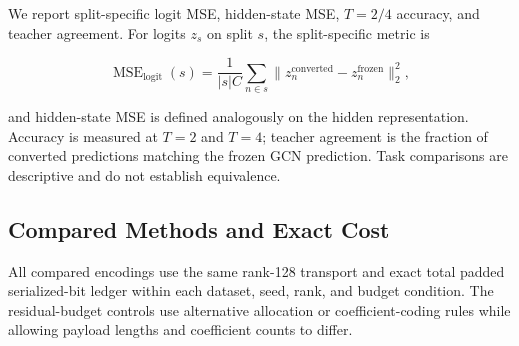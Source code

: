 \documentclass{article}
\begin{document}
We report split-specific logit MSE, hidden-state MSE, \(T=2/4\) accuracy, and teacher agreement. For logits \(z_s\) on split \(s\), the split-specific metric is

\begin{equation}
\operatorname{MSE}_{\operatorname{logit}}(s)=\frac{1}{|s|C}\sum_{n\in s}\lVert z_n^{\operatorname{converted}}-z_n^{\operatorname{frozen}}\rVert_2^2,
\end{equation}

and hidden-state MSE is defined analogously on the hidden representation. Accuracy is measured at \(T=2\) and \(T=4\); teacher agreement is the fraction of converted predictions matching the frozen GCN prediction. Task comparisons are descriptive and do not establish equivalence.

\subsection{Compared Methods and Exact Cost}

\label{sec:compared_methods_and_exact_cost}

All compared encodings use the same rank-128 transport and exact total padded serialized-bit ledger within each dataset, seed, rank, and budget condition. The residual-budget controls use alternative allocation or coefficient-coding rules while allowing payload lengths and coefficient counts to differ.
\end{document}
